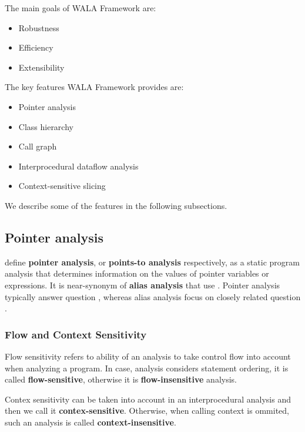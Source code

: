 The main goals of WALA Framework are:
\begin{itemize}
  \item Robustness
  \item Efficiency
  \item Extensibility
\end{itemize}

The key features WALA Framework provides are:
\begin{itemize}
  \item Pointer analysis
  \item Class hierarchy
  \item Call graph
  \item Interprocedural dataflow analysis
  \item Context-sensitive slicing
\end{itemize}

We describe some of the features in the following subsections.



\subsection{Pointer analysis}

\citet{PointerAnalysis} define \textbf{pointer analysis},
or \textbf{points-to analysis} respectively, as a static program analysis that
determines information on the values of pointer variables or expressions.
It is near-synonym of \textbf{alias analysis} that use \citet{AliasAnalysis}.
Pointer analysis typically answer question
,
whereas alias analysis focus on closely related question
.




\subsubsection{Flow and Context Sensitivity}

Flow sensitivity refers to ability of an analysis to take control flow
into account when analyzing a program.
In case, analysis considers statement ordering, it is called \textbf{flow-sensitive},
otherwise it is \textbf{flow-insensitive} analysis.

Contex sensitivity can be taken into account in an interprocedural analysis and
then we call it \textbf{contex-sensitive}. Otherwise, when calling context is ommited,
such an analysis is called \textbf{context-insensitive}.





